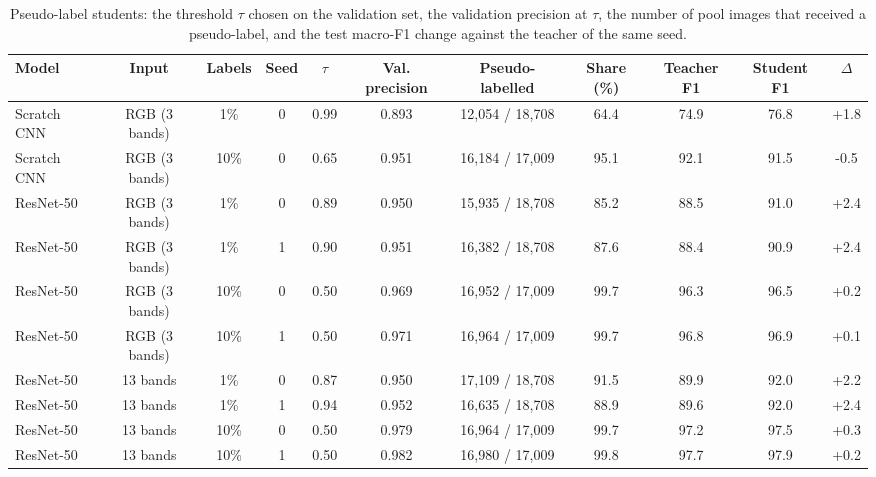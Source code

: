\begin{table}[t]
\centering
\caption{Pseudo-label students: the threshold $\tau$ chosen on the validation set, the validation precision at $\tau$, the number of pool images that received a pseudo-label, and the test macro-F1 change against the teacher of the same seed.}
\label{tab:pl_details}
\scriptsize
\begin{tabular}{lcccccccccc}
\toprule
Model & Input & Labels & Seed & $\tau$ & Val. precision & Pseudo-labelled & Share (\%) & Teacher F1 & Student F1 & $\Delta$ \\
\midrule
Scratch CNN & RGB (3 bands) & 1\% & 0 & 0.99 & 0.893 & 12,054 / 18,708 & 64.4 & 74.9 & 76.8 & +1.8 \\
Scratch CNN & RGB (3 bands) & 10\% & 0 & 0.65 & 0.951 & 16,184 / 17,009 & 95.1 & 92.1 & 91.5 & -0.5 \\
ResNet-50 & RGB (3 bands) & 1\% & 0 & 0.89 & 0.950 & 15,935 / 18,708 & 85.2 & 88.5 & 91.0 & +2.4 \\
ResNet-50 & RGB (3 bands) & 1\% & 1 & 0.90 & 0.951 & 16,382 / 18,708 & 87.6 & 88.4 & 90.9 & +2.4 \\
ResNet-50 & RGB (3 bands) & 10\% & 0 & 0.50 & 0.969 & 16,952 / 17,009 & 99.7 & 96.3 & 96.5 & +0.2 \\
ResNet-50 & RGB (3 bands) & 10\% & 1 & 0.50 & 0.971 & 16,964 / 17,009 & 99.7 & 96.8 & 96.9 & +0.1 \\
ResNet-50 & 13 bands & 1\% & 0 & 0.87 & 0.950 & 17,109 / 18,708 & 91.5 & 89.9 & 92.0 & +2.2 \\
ResNet-50 & 13 bands & 1\% & 1 & 0.94 & 0.952 & 16,635 / 18,708 & 88.9 & 89.6 & 92.0 & +2.4 \\
ResNet-50 & 13 bands & 10\% & 0 & 0.50 & 0.979 & 16,964 / 17,009 & 99.7 & 97.2 & 97.5 & +0.3 \\
ResNet-50 & 13 bands & 10\% & 1 & 0.50 & 0.982 & 16,980 / 17,009 & 99.8 & 97.7 & 97.9 & +0.2 \\
\bottomrule
\end{tabular}
\end{table}

